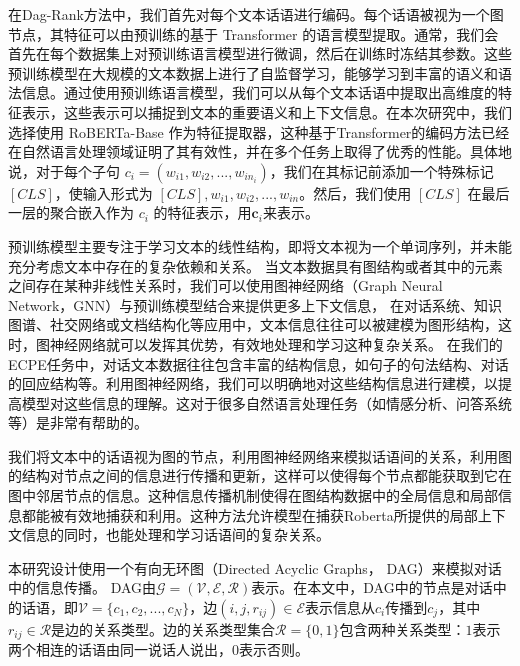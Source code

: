 
    



\label{sec:encode}

在Dag-Rank方法中，我们首先对每个文本话语进行编码。每个话语被视为一个图节点，其特征可以由预训练的基于 Transformer 的语言模型提取。通常，我们会首先在每个数据集上对预训练语言模型进行微调，然后在训练时冻结其参数。这些预训练模型在大规模的文本数据上进行了自监督学习，能够学习到丰富的语义和语法信息。通过使用预训练语言模型，我们可以从每个文本话语中提取出高维度的特征表示，这些表示可以捕捉到文本的重要语义和上下文信息。在本次研究中，我们选择使用 RoBERTa-Base 作为特征提取器，这种基于Transformer的编码方法已经在自然语言处理领域证明了其有效性，并在多个任务上取得了优秀的性能。具体地说，对于每个子句 $c_i=(w_{i1}, w_{i2},...,w_{in_i})$，我们在其标记前添加一个特殊标记 $[CLS]$，使输入形式为 ${[CLS],w_{i1}, w_{i2},...,w_{in}}$。然后，我们使用 $[CLS]$ 在最后一层的聚合嵌入作为 $c_i$ 的特征表示，用$\mathbf{c}_i$来表示。


预训练模型主要专注于学习文本的线性结构，即将文本视为一个单词序列，并未能充分考虑文本中存在的复杂依赖和关系。
当文本数据具有图结构或者其中的元素之间存在某种非线性关系时，我们可以使用图神经网络（Graph Neural Network，GNN）与预训练模型结合来提供更多上下文信息，
在对话系统、知识图谱、社交网络或文档结构化等应用中，文本信息往往可以被建模为图形结构，这时，图神经网络就可以发挥其优势，有效地处理和学习这种复杂关系。
在我们的ECPE任务中，对话文本数据往往包含丰富的结构信息，如句子的句法结构、对话的回应结构等。利用图神经网络，我们可以明确地对这些结构信息进行建模，以提高模型对这些信息的理解。这对于很多自然语言处理任务（如情感分析、问答系统等）是非常有帮助的。

我们将文本中的话语视为图的节点，利用图神经网络来模拟话语间的关系，利用图的结构对节点之间的信息进行传播和更新，这样可以使得每个节点都能获取到它在图中邻居节点的信息。这种信息传播机制使得在图结构数据中的全局信息和局部信息都能被有效地捕获和利用。这种方法允许模型在捕获Roberta所提供的局部上下文信息的同时，也能处理和学习话语间的复杂关系。

\label{sec:build_dag}

本研究设计使用一个有向无环图（Directed Acyclic Graphs， DAG）来模拟对话中的信息传播。 DAG由$\mathcal{G}=(\mathcal{V},\mathcal{E},\mathcal{R})$表示。在本文中，DAG中的节点是对话中的话语，即$\mathcal{V}=\{c_1,c_2,...,c_N\}$，边$(i,j,r_{ij})\in\mathcal{E}$表示信息从$c_i$传播到$c_j$，其中$r_{ij}\in\mathcal{R}$是边的关系类型。边的关系类型集合$\mathcal{R}=\{0,1\}$包含两种关系类型：$1$表示两个相连的话语由同一说话人说出，$0$表示否则。

